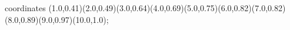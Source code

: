 					coordinates { (1.0,0.41)(2.0,0.49)(3.0,0.64)(4.0,0.69)(5.0,0.75)(6.0,0.82)(7.0,0.82)(8.0,0.89)(9.0,0.97)(10.0,1.0)};